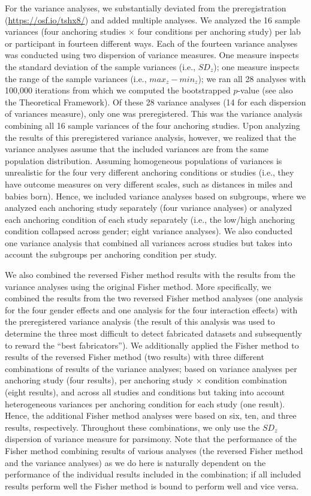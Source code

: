\documentclass[a5paper]{book}
\begin{document}
For the variance analyses, we substantially deviated from the
preregistration (\url{https://osf.io/tshx8/}) and added multiple
analyses. We analyzed the 16 sample variances (four anchoring studies
\(\times\) four conditions per anchoring study) per lab or participant
in fourteen different ways. Each of the fourteen variance analyses was
conducted using two dispersion of variance measures. One measure
inspects the standard deviation of the sample variances (i.e.,
\(SD_z\)); one measure inspects the range of the sample variances (i.e.,
\(max_z-min_z\)); we ran all 28 analyses with 100,000 iterations from
which we computed the bootstrapped \(p\)-value (see also the Theoretical
Framework). Of these 28 variance analyses (14 for each dispersion of
variances measure), only one was preregistered. This was the variance
analysis combining all 16 sample variances of the four anchoring
studies. Upon analyzing the results of this preregistered variance
analysis, however, we realized that the variance analyses assume that
the included variances are from the same population distribution.
Assuming homogeneous populations of variances is unrealistic for the
four very different anchoring conditions or studies (i.e., they have
outcome measures on very different scales, such as distances in miles
and babies born). Hence, we included variance analyses based on
subgroups, where we analyzed each anchoring study separately (four
variance analyses) or analyzed each anchoring condition of each study
separately (i.e., the low/high anchoring condition collapsed across
gender; eight variance analyses). We also conducted one variance
analysis that combined all variances across studies but takes into
account the subgroups per anchoring condition per study.

We also combined the reversed Fisher method results with the results
from the variance analyses using the original Fisher method. More
specifically, we combined the results from the two reversed Fisher
method analyses (one analysis for the four gender effects and one
analysis for the four interaction effects) with the preregistered
variance analysis (the result of this analysis was used to determine the
three most difficult to detect fabricated datasets and subsequently to
reward the \enquote{best fabricators}). We additionally applied the
Fisher method to results of the reversed Fisher method (two results)
with three different combinations of results of the variance analyses;
based on variance analyses per anchoring study (four results), per
anchoring study \(\times\) condition combination (eight results), and
across all studies and conditions but taking into account heterogeneous
variances per anchoring condition for each study (one result). Hence,
the additional Fisher method analyses were based on six, ten, and three
results, respectively. Throughout these combinations, we only use the
\(SD_z\) dispersion of variance measure for parsimony. Note that the
performance of the Fisher method combining results of various analyses
(the reversed Fisher method and the variance analyses) as we do here is
naturally dependent on the performance of the individual results
included in the combination; if all included results perform well the
Fisher method is bound to perform well and vice versa.
\end{document}
